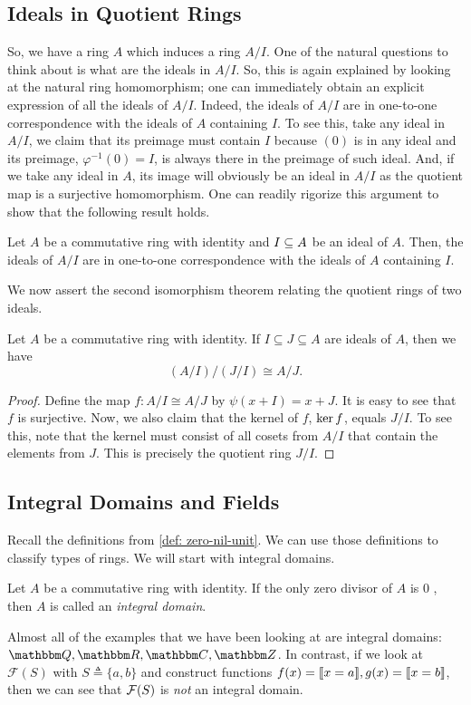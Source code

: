 \subsection{Ideals in Quotient Rings}
So, we have a ring $A$ which induces a ring $A / I$. One of the natural questions to think about is what are the ideals in $A / I$. So, this is again explained by looking at the natural ring homomorphism; one can immediately obtain an explicit expression of all the ideals of $A / I$. 
Indeed, the ideals of $A / I$ are in one-to-one correspondence with the ideals of $A$ containing $I$. To see this, take any ideal in $A/I$, we claim that its preimage must contain $I$ because $(0)$ is in any ideal and its preimage, $\varphi^{-1}(0) = I$, is always there in the preimage of such ideal. And, if we take any ideal in $A$, its image will obviously be an ideal in $A / I$ as the quotient map is a surjective homomorphism. One can readily rigorize this argument to show that the following result holds.
\begin{theorem}\label{thm: ideal-correspondence}
    Let $A$ be a commutative ring with identity and $I\ss A$ be an ideal of $A$. Then, the ideals of $A / I$ are in one-to-one correspondence with the ideals of $A$ containing $I$.
\end{theorem}

We now assert the second isomorphism theorem relating the quotient rings of two ideals.
\begin{theorem}\label{thm: second-iso-ring}
Let $A$ be a commutative ring with identity. If $I \subseteq J \subseteq A$ are ideals of $A$, then we have
    \[(A / I) /(J / I) \cong A / J.\]
\end{theorem}
\begin{proof}
    Define the map $f: A / I \cong A / J$ by $\psi(x+I) = x+J$. It is easy to see that $f$ is surjective. Now, we also claim that the kernel of $f$, $\Ker{f}$, equals $J/I$.
    To see this, note that the kernel must consist of all cosets from $A/I$ that contain the elements from $J$. This is precisely the quotient ring $J/I$.
\end{proof}

 \subsection{Integral Domains and Fields}
 Recall the definitions from \cref{def: zero-nil-unit}. We can use those definitions to classify types of rings. We will start with integral domains.
\begin{definition}
    Let $A$ be a commutative ring with identity. If the only zero divisor of $A$ is 0 , then $A$ is called an {\it integral domain}.
\end{definition}
\begin{example}
    Almost all of the examples that we have been looking at are integral domains: ${\Q}, {\R}, {\C}, {\Z}$. In contrast, if we look at $\mathcal{F}(S)$ with $S\triangleq\{a,b\}$ and construct functions $f(x) = \iverson{x = a}, g(x) = \iverson{x = b}$, then we can see that $\calF(S)$ is {\it not} an integral domain.
\end{example}

